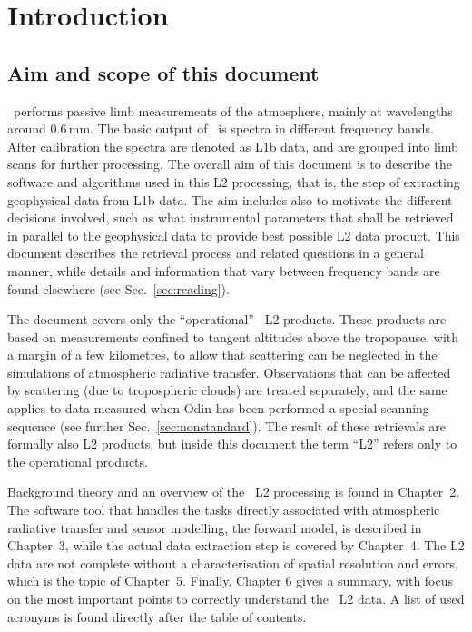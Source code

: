 \chapter{Introduction}
\label{chapter:introduction}

\setcounter{page}{1}


\section{Aim and scope of this document}
\label{sec:aim}
%
\smr\ performs passive limb measurements of the atmosphere, mainly at wavelengths
around 0.6\,mm. The basic output of \smr\ is spectra in different frequency
bands. After calibration the spectra are denoted as L1b data, and are grouped
into limb scans for further processing. The overall aim of this document is to
describe the software and algorithms used in this L2 processing, that is, the
step of extracting geophysical data from L1b data. The aim includes also to
motivate the different decisions involved, such as what instrumental parameters
that shall be retrieved in parallel to the geophysical data to provide best
possible L2 data product. This document describes the retrieval process and
related questions in a general manner, while details and information that
vary between frequency bands are found elsewhere (see
Sec.~\ref{sec:reading}).

The document covers only the ``operational'' \smr\ L2 products. These products
are based on measurements confined to tangent altitudes above the tropopause,
with a margin of a few kilometres, to
allow that scattering can be neglected in the simulations of atmospheric
radiative transfer. Observations that can be affected by scattering (due to
tropospheric clouds) are treated separately, and the same applies to data
measured when Odin has been performed a special scanning sequence (see further
Sec.~\ref{sec:nonstandard}). The result of these retrievals are formally also
L2 products, but inside this document the term ``L2'' refers only to the
operational products.

Background theory and an overview of the \smr\ L2 processing is found in
Chapter~2. The software tool that handles the tasks directly associated with
atmospheric radiative transfer and sensor modelling, the forward model, is
described in Chapter~3, while the actual data extraction step is covered by
Chapter~4. The L2 data are not complete without a characterisation of
spatial resolution and errors, which is the topic of Chapter~5. Finally,
Chapter 6 gives a summary, with focus on the most important points to correctly
understand the \smr\ L2 data. A list of used acronyms is found directly after
the table of contents.




